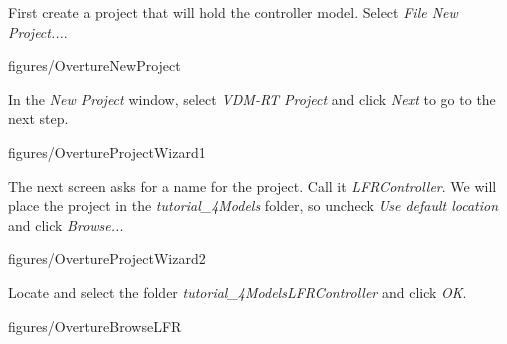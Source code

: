 \documentclass[11pt,a4paper]{../tutorial}
\begin{document}
\begin{instructions}
\newpage

\item First create a project that will hold the controller model. Select \emph{File \menusep New \menusep Project...}.

    \begin{annotation}[width=\linewidth,trim=0 250 0 0,clip]{figures/OvertureNewProject}
    \end{annotation}



\item In the \emph{New Project} window, select \emph{VDM-RT Project} and click \emph{Next \menusep} to go to the next step.

    \begin{annotation}[width=0.6\linewidth]{figures/OvertureProjectWizard1}
    \end{annotation}

\newpage

\item The next screen asks for a name for the project. Call it \emph{LFRController}. We will place the project in the \emph{tutorial\_4\pathsep{}Models} folder, so uncheck \emph{Use default location} and click \emph{Browse...}

    \begin{annotation}[width=0.6\linewidth]{figures/OvertureProjectWizard2}
    \end{annotation}


\item Locate and select the folder \emph{tutorial\_4\pathsep{}Models\pathsep{}LFRController} and click \emph{OK}.

    \begin{annotation}[width=0.55\linewidth]{figures/OvertureBrowseLFR}
    \end{annotation}

\newpage


\end{instructions}
\end{document}
